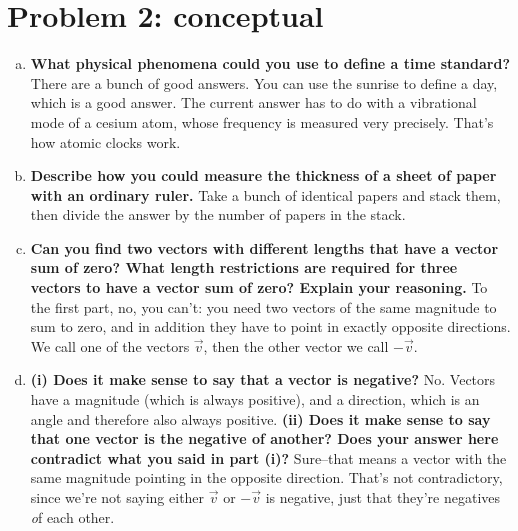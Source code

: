 \documentclass[10pt,letter]{article}
\begin{document}
\section*{Problem 2: conceptual}
\begin{enumerate}[(a)]
\item {\bf What physical phenomena could you use to define a time standard?}
\hspace{2pt}
There are a bunch of good answers. You can use the sunrise to define a day, which is a good answer. The current answer has to do with a vibrational mode of a cesium atom, whose frequency is measured very precisely. That's how atomic clocks work.
\item  {\bf Describe how you could measure the thickness of a sheet of paper with an ordinary ruler.}
\hspace{2pt}
Take a bunch of identical papers and stack them, then divide the answer by the number of papers in the stack.
\item {\bf Can you find two vectors with different lengths that have a vector sum of zero? What length restrictions are required for three vectors to have a vector sum of zero? Explain your reasoning.}
\hspace{2pt}
To the first part, no, you can't: you need two vectors of the same magnitude to sum to zero, and in addition they have to point in exactly opposite directions. We call one of the vectors $\vec{v}$, then the other vector we call $-\vec{v}$.
\item {\bf (i) Does it make sense to say that a vector is negative?}
No. Vectors have a magnitude (which is always positive), and a direction, which is an angle and therefore also always positive. 
\hspace{2pt}
{\bf (ii) Does it make sense to say that one vector is the negative of another? Does your answer here contradict what you said in part (i)?}
Sure--that means a vector with the same magnitude pointing in the opposite direction. That's not contradictory, since we're not saying either $\vec{v}$ or $-\vec{v}$ is negative, just that they're negatives {\textit of each other.}


\end{enumerate}
\end{document}
